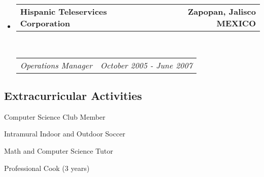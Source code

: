\documentclass[10pt,letterpaper]{article}
\makeatletter
\newenvironment{indentsection}[1]%
{\begin{list}{}%
	{\setlength{\leftmargin}{#1}}%
	\item[]%
}
{\end{list}}
\newcommand{\headerrow}[2]
{\begin{tabular*}{\linewidth}{l@{\extracolsep{\fill}}r}
	#1 &
	#2 \\
\end{tabular*}}
\makeatother
\begin{document}
\begin{itemize}
	\item
	\headerrow
		{\textbf{Hispanic Teleservices Corporation}}
		{\textbf{Zapopan, Jalisco MEXICO}}
	\\
	\headerrow
		{\emph{Operations Manager}}
		{\emph{October 2005 - June 2007}}

\end{itemize}

\vspace{-0.4em}
\subsection*{Extracurricular Activities}

\begin{indentsection}{\parindent}
	\begin{itemize*}
		\item Computer Science Club Member
		\item Intramural Indoor and Outdoor Soccer
		\item Math and Computer Science Tutor 
		\item Professional Cook (3 years)
	\end{itemize*}
\end{indentsection}
\end{document}
